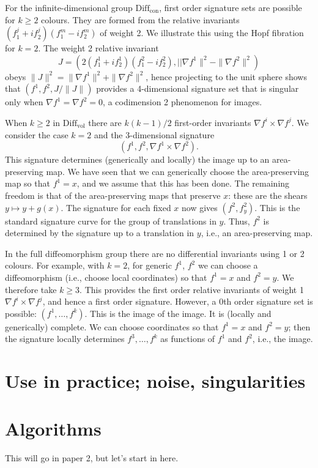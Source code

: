 \documentclass[review,onefignum,onetabnum]{siamonline190516}
\begin{document}
For the infinite-dimensional group $\mathrm{Diff}_{\mathrm{con}}$, first order signature sets are possible for $k \ge 2$ colours. They are formed from the relative invariants $(f^j_1 + i f^j_2)(f^m_1 - i f^m_2)$ of weight 2. We illustrate this using the Hopf fibration for $k=2$. The weight 2 relative invariant $$J = (2(f^1_1 + i f^1_2)(f^2_1 - i f^2_2), ||\nabla f^1\|^2 - \|\nabla f^2\|^2)$$ obeys $\|J\|^2 = \|\nabla f^1\|^2 + \|\nabla f^2\|^2$, hence projecting to the unit sphere shows that $(f^1,f^2,J/\|J\|)$ provides a 4-dimensional signature set that is singular only when $\nabla f^1 = \nabla f^2 = 0$, a codimension 2 phenomenon for images.

When $k\ge 2$ in $\mathrm{Diff}_{\mathrm{vol}}$ there are $k(k-1)/2$ first-order invariants $ \nabla f^i \times \nabla f^j$.  We consider the case $k=2$ and the 3-dimensional signature $$ (f^1,f^2, \nabla f^1 \times \nabla f^2).$$ This signature determines (generically and locally) the image up to an area-preserving map.  We have seen that we can generically choose the area-preserving map so that $f^1=x$, and we assume that this has been done. The remaining freedom is that of the area-preserving maps that preserve $x$: these are the shears $y\mapsto y + g(x)$. The signature for each fixed $x$ now gives $(f^2,f^2_y)$. This is the standard signature curve for the group of translations in $y$. Thus, $f^2$ is determined by the signature up to a translation in $y$, i.e., an area-preserving map.

In the full diffeomorphism group there are no differential invariants using 1 or 2 colours. For example, with $k=2$, for generic $f^1$, $f^2$ we can choose a diffeomorphism (i.e., choose local coordinates) so that $f^1=x$ and $f^2=y$. We therefore take $k\ge 3$. This provides the first order relative invariants of weight 1 $\nabla f^i\times \nabla f^j$, and hence a first order signature. However, a 0th order signature set is possible: $(f^1,\dots,f^k)$. This is the image of the image. It is (locally and generically) complete. We can choose coordinates so that $f^1=x$ and $f^2=y$; then the signature locally determines $f^3,\dots,f^k$ as functions of $f^1$ and $f^2$, i.e., the image.

\section{Use in practice; noise, singularities}

\section{Algorithms}
 This will go in paper 2, but let's start in here.
\end{document}
